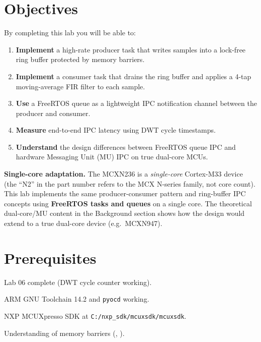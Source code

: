 \documentclass[11pt, a4paper]{article}
\begin{document}

\section{Objectives}

By completing this lab you will be able to:

\begin{enumerate}[noitemsep, leftmargin=*]
  \item \textbf{Implement} a high-rate producer task that writes samples into a lock-free
        ring buffer protected by  memory barriers.
  \item \textbf{Implement} a consumer task that drains the ring buffer and applies a
        4-tap moving-average FIR filter to each sample.
  \item \textbf{Use} a FreeRTOS queue as a lightweight IPC notification channel between
        the producer and consumer.
  \item \textbf{Measure} end-to-end IPC latency using DWT cycle timestamps.
  \item \textbf{Understand} the design differences between FreeRTOS queue IPC and
        hardware Messaging Unit (MU) IPC on true dual-core MCUs.
\end{enumerate}

\begin{warnbox}
  \textbf{Single-core adaptation.}
  The MCXN236 is a \emph{single-core} Cortex-M33 device (the ``N2'' in the part
  number refers to the MCX N-series family, not core count). This lab implements
  the same producer-consumer pattern and ring-buffer IPC concepts using
  \textbf{FreeRTOS tasks and queues} on a single core. The theoretical
  dual-core/MU content in the Background section shows how the design would extend
  to a true dual-core device (e.g.\ MCXN947).
\end{warnbox}

\section{Prerequisites}

\begin{checklist}
  \item Lab 06 complete (DWT cycle counter working).
  \item ARM GNU Toolchain 14.2 and \texttt{pyocd} working.
  \item NXP MCUXpresso SDK at \texttt{C:/nxp\_sdk/mcuxsdk/mcuxsdk}.
  \item Understanding of memory barriers (, ).
\end{checklist}
\end{document}
